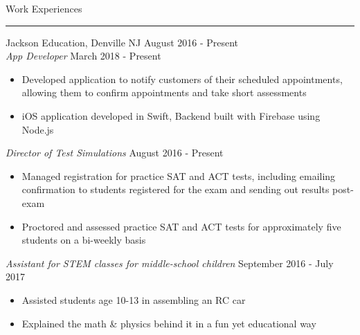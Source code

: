 \documentclass{article}
\newcommand \spacingBetweenHeadings {0.5em}
\begin{document}
\noindent
\huge Work Experiences\par
\vspace{0.1em}
\hrule
\Large
\vspace{1em}
\noindent
Jackson Education, Denville NJ
\hfill
August 2016 - Present\\
\textit{App Developer}
\hfill
March 2018 - Present\\
\vspace{-1em}
\begin{itemize}
\item Developed application to notify customers of their scheduled appointments, allowing them to \mbox{confirm} appointments and take short assessments
\item iOS application developed in Swift, Backend built with Firebase using Node.js
\end{itemize}
\textit{Director of Test Simulations}
\hfill
August 2016 - Present\\
\vspace{-1em}
\begin{itemize}
\item Managed registration for practice SAT and ACT tests, including emailing confirmation to students registered for the exam and sending out results post-exam
\item Proctored and assessed practice SAT and ACT tests for approximately five students on a bi-weekly basis
\end{itemize}
\textit{Assistant for STEM classes for middle-school children}
\hfill
September 2016 - July 2017
\begin{itemize}
\item Assisted students age 10-13 in assembling an RC car
\item Explained the math \& physics behind it in a fun yet educational way
\end{itemize}
\vspace{\spacingBetweenHeadings}
\end{document}
